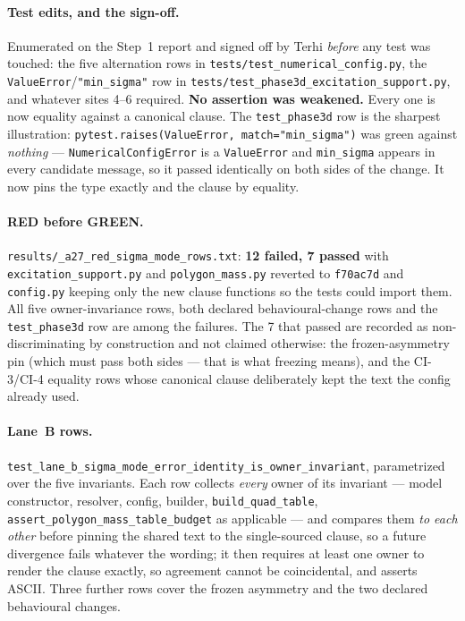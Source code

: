 \documentclass[
  10pt,
]{article}
\begin{document}
\paragraph{Test edits, and the sign-off.}
Enumerated on the Step~1 report and signed off by Terhi \emph{before} any test was touched: the five alternation rows in \texttt{tests/test\_numerical\_config.py}, the \texttt{ValueError}/\texttt{"min\_sigma"} row in \texttt{tests/test\_phase3d\_excitation\_support.py}, and whatever sites 4--6 required. \textbf{No assertion was weakened.} Every one is now equality against a canonical clause. The \texttt{test\_phase3d} row is the sharpest illustration: \texttt{pytest.raises(ValueError, match="min\_sigma")} was green against \emph{nothing} --- \texttt{NumericalConfigError} is a \texttt{ValueError} and \texttt{min\_sigma} appears in every candidate message, so it passed identically on both sides of the change. It now pins the type exactly and the clause by equality.

\paragraph{RED before GREEN.}
\texttt{results/\allowbreak{}\_a27\_red\_\allowbreak{}sigma\_mode\_rows.txt}: \textbf{12 failed, 7 passed} with \texttt{excitation\_support.py} and \texttt{polygon\_mass.py} reverted to \texttt{f70ac7d} and \texttt{config.py} keeping only the new clause functions so the tests could import them. All five owner-invariance rows, both declared behavioural-change rows and the \texttt{test\_phase3d} row are among the failures. The 7 that passed are recorded as non-discriminating by construction and not claimed otherwise: the frozen-asymmetry pin (which must pass both sides --- that is what freezing means), and the CI-3/CI-4 equality rows whose canonical clause deliberately kept the text the config already used.

\paragraph{Lane~B rows.}
\texttt{test\_lane\_b\_sigma\_mode\_error\_identity\_is\_owner\_invariant}, parametrized over the five invariants. Each row collects \emph{every} owner of its invariant --- model constructor, resolver, config, builder, \texttt{build\_quad\_table}, \texttt{assert\_polygon\_mass\_table\_budget} as applicable --- and compares them \emph{to each other} before pinning the shared text to the single-sourced clause, so a future divergence fails whatever the wording; it then requires at least one owner to render the clause exactly, so agreement cannot be coincidental, and asserts ASCII. Three further rows cover the frozen asymmetry and the two declared behavioural changes.
\end{document}

